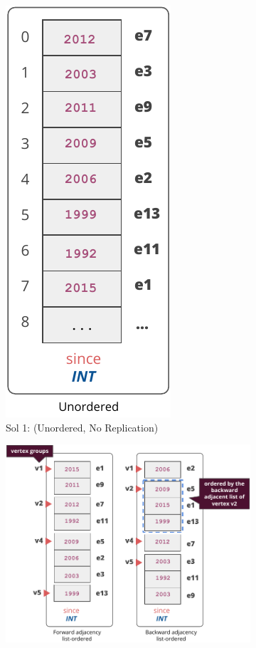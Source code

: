 \begin{figure}
	\vspace{-25pt}
	\hspace*{-20pt}
	\begin{subfigure}{0.45\textwidth}
		\vspace{8pt}
		\centering
		\includegraphics[scale=0.8]{img/sol1}
		\captionsetup{justification=centering}
		\caption{Sol 1: (Unordered, No Replication)}
		\label{fig:sol1}
	\end{subfigure}
	\begin{subfigure}{0.55\textwidth}
		\centering
		\includegraphics[scale=0.8]{img/sol2}

\end{subfigure}
\end{figure}
